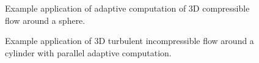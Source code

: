 \begin{figure}[!h]
\caption{
Example application of adaptive computation of 3D compressible flow
around a sphere.  }
\label{fig:compr3D}
\end{figure}

\begin{figure}[!h]
\caption{
Example application of 3D turbulent incompressible flow around a
cylinder with parallel adaptive computation. }
\label{fig:parcyl3D}
\end{figure}


\label{chapter:implementation:unicorn}




